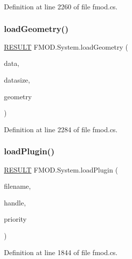 Definition at line 2260 of file fmod.\+cs.

\mbox{\label{class_f_m_o_d_1_1_system_abe272d976974e84f3815bcd7f859a1cc}} 
\subsubsection{\texorpdfstring{load\+Geometry()}{loadGeometry()}}
{\footnotesize\ttfamily \hyperlink{namespace_f_m_o_d_a305d1176ef3f8c8815861a60407ac33d}{R\+E\+S\+U\+LT} F\+M\+O\+D.\+System.\+load\+Geometry (\begin{DoxyParamCaption}\item[{Int\+Ptr}]{data,  }\item[{int}]{datasize,  }\item[{out \hyperlink{class_f_m_o_d_1_1_geometry}{Geometry}}]{geometry }\end{DoxyParamCaption})}



Definition at line 2284 of file fmod.\+cs.

\mbox{\label{class_f_m_o_d_1_1_system_a6be71008c7560442c4b2eece6fb3a5e0}} 
\subsubsection{\texorpdfstring{load\+Plugin()}{loadPlugin()}\hspace{0.1cm}{\footnotesize\ttfamily [1/2]}}
{\footnotesize\ttfamily \hyperlink{namespace_f_m_o_d_a305d1176ef3f8c8815861a60407ac33d}{R\+E\+S\+U\+LT} F\+M\+O\+D.\+System.\+load\+Plugin (\begin{DoxyParamCaption}\item[{string}]{filename,  }\item[{out uint}]{handle,  }\item[{uint}]{priority }\end{DoxyParamCaption})}



Definition at line 1844 of file fmod.\+cs.

\mbox{\label{class_f_m_o_d_1_1_system_a60d0f02bef548e7777a8d94b5d930ffd}} 
